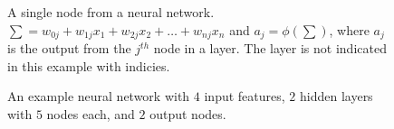 \documentclass[11pt]{article}
\begin{document}
\begin{minipage}{0.47\linewidth}
  \begin{figure}[H]
    \centering
    
    \caption{A single node from a neural network. $\sum = w_{0j} + w_{1j}x_{1} + w_{2j}x_{2} + \ldots + w_{nj}x_{n}$ and $a_j = \phi(\sum)$, where $a_j$ is the output from the $j^{th}$ node in a layer. The layer is not indicated in this example with indicies.}
    \label{fig:node}
  \end{figure}
\end{minipage}\hfill
\begin{minipage}{0.47\linewidth}
  \begin{figure}[H]
    \centering
    
    \caption{An example neural network with $4$ input features, $2$ hidden layers with $5$ nodes each, and $2$ output nodes.}
    \label{fig:mlp_ex}
  \end{figure}
\end{minipage}\vspace{0.5cm}
\end{document}
